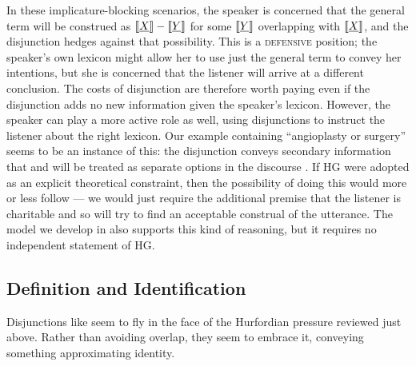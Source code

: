\documentclass[12pt,twoside]{article}
\renewcommand{\_}{\textbf{\textunderscore\hspace{-4pt}\textunderscore\hspace{-3pt}\textunderscore\hspace{-4pt}\textunderscore}\hspace{0.5pt}}			%
\newcommand{\technicalTerm}[1]{\textsc{#1}}
\begin{document}
In these implicature-blocking scenarios, the speaker is concerned that
the general term  will be construed as
$\llbracket\emph{X\/}\rrbracket-\llbracket\emph{Y\/}\rrbracket$ for some $\llbracket\emph{Y\/}\rrbracket$
overlapping with $\llbracket\emph{X\/}\rrbracket$, and the disjunction hedges
against that possibility. This is a \technicalTerm{defensive}
position; the speaker's own lexicon might allow her to use just the
general term to convey her intentions, but she is concerned that the
listener will arrive at a different conclusion. The costs of
disjunction are therefore worth paying even if the disjunction adds no
new information given the speaker's lexicon.  However, the speaker can
play a more active role as well, using disjunctions to instruct the
listener about the right lexicon. Our 
example containing ``angioplasty or surgery'' seems to be an instance
of this: the disjunction conveys secondary information that
 and  will be treated as separate
options in the discourse \citep{Simons:2001}. If HG were adopted as an
explicit theoretical constraint, then the possibility of doing this
would more or less follow --- we would just require the additional
premise that the listener is charitable and so will try to find an
acceptable construal of the utterance. The model we develop in
 also supports this kind of reasoning, but it
requires no independent statement of HG.
 

\subsection{Definition and Identification}\label{sec:data:definitional}

Disjunctions like  seem to fly in the
face of the Hurfordian pressure reviewed just above. Rather than
avoiding overlap, they seem to embrace it, conveying something
approximating identity.
\end{document}
